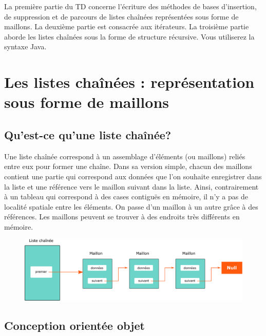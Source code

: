 \documentclass[iutinfo,a4paper,nocorrections,10pt]{ustl-tdtp}
\date{\annee{2018}--\annee{2019}}
\begin{document}
\maketitle
\thispagestyle{empty}



La première partie du TD concerne l'écriture des méthodes de bases d'insertion, de suppression et de parcours de listes chaînées représentées sous forme de maillons. La deuxième partie est consacrée aux itérateurs. La troisième partie aborde les listes chaînées sous la forme de structure récursive. Vous utiliserez la syntaxe Java.


\section{Les listes chaînées : représentation sous forme de maillons}

\subsection{Qu'est-ce qu'une liste chaînée?}

Une liste chaînée correspond à un assemblage d'éléments (ou maillons) reliés entre eux pour former une chaîne. Dans sa version simple, chacun des maillons contient une partie qui correspond aux données que l'on souhaite enregistrer dans la liste et une référence vers le maillon suivant dans la liste. Ainsi, contrairement à un tableau qui correspond à des cases contiguës en mémoire, il n'y a pas de localité spatiale entre les éléments. On passe d'un maillon à un autre grâce à des références. Les maillons peuvent se trouver à des endroits très différents en mémoire.

\begin{figure}[!h]
\centering
\label{tableau}
\includegraphics[scale=0.5]{figs/linked_list}
\caption{}
\end{figure}

\subsection{Conception orientée objet}
\end{document}
